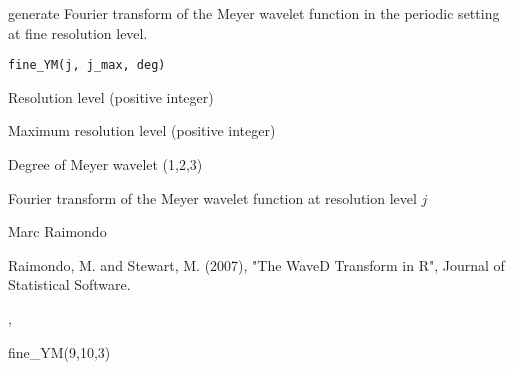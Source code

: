 \begin{Description}\relax
generate Fourier transform  of the Meyer wavelet function in the periodic setting
at fine resolution level.
\end{Description}
\begin{Usage}
\begin{verbatim}
fine_YM(j, j_max, deg)
\end{verbatim}
\end{Usage}
\begin{Arguments}
\begin{ldescription}
\item[\code{j}] Resolution level (positive integer) 
\item[\code{j\_max}] Maximum resolution level (positive integer)
\item[\code{deg}] Degree of Meyer wavelet (1,2,3) 
\end{ldescription}
\end{Arguments}
\begin{Value}
Fourier transform  of the Meyer wavelet function at resolution level $j$
\end{Value}
\begin{Author}\relax
Marc Raimondo
\end{Author}
\begin{References}\relax
Raimondo, M. and Stewart, M. (2007),
"The WaveD Transform in R", Journal of Statistical Software.
\end{References}
\begin{SeeAlso}\relax
{},
\end{SeeAlso}
\begin{Examples}
\begin{ExampleCode}
fine_YM(9,10,3)
\end{ExampleCode}
\end{Examples}

